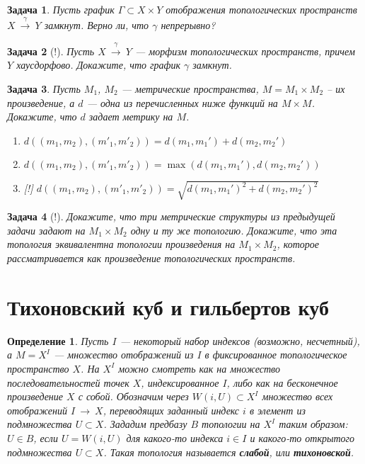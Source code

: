 \documentclass[12pt]{book}
\newcommand{\subs}{\section}
\newcommand{\arrow}{{\:\longrightarrow\:}}
\theoremstyle{upshape}
\newtheorem{zadacha}{Задача}[chapter]
\theoremstyle{generic}
\newtheorem{opredelenie}[teorema]{Определение}
\theoremstyle{upshapenonumber}
\newcommand{\следствие}{%
     \refstepcounter{teorema}
     {\noindent\bf Следствие \thechapter.\arabic{teorema}:\ }}
\newcommand{\пример}{%
     \refstepcounter{teorema}
     {\noindent\bf Пример \thechapter.\arabic{teorema}:\ }}
\newcommand{\лемма}{%
     \refstepcounter{teorema}
     {\noindent\bf Лемма \thechapter.\arabic{teorema}:\ }}
\newcommand{\теорема}{%
     \refstepcounter{teorema}
     {\noindent\bf Теорема \thechapter.\arabic{teorema}:\ }}
\newcommand{\утверждение}{%
     \refstepcounter{teorema}
     {\noindent\bf Утверждение \thechapter.\arabic{teorema}:\ }}
\def\бф{\bf}
\def\ит{\it}
\def\итем{\item %
}
\begin{document}
{\begin{zadacha}
Пусть график $\Gamma\subset X\times Y$ отображения топологических
пространств $X\overset{\gamma}{\arrow} Y$ замкнут. Верно ли, что
$\gamma$ непрерывно?
\end{zadacha}

\begin{zadacha}[!]
Пусть $X\overset{\gamma}{\arrow} Y$ --- морфизм топологических
пространств, причем $Y$ хаусдорфово. Докажите, что график $\gamma$
замкнут.
\end{zadacha}

\begin{zadacha} 
Пусть $M_1$, $M_2$ --- метрические пространства, $M=M_1\times M_2$ --
их произведение, а $d$ --- одна из перечисленных ниже функций на
$M\times M$. Докажите, что $d$ задает метрику на $M$.
\begin{enumerate}
\итем $d((m_1, m_2), (m'_1, m'_2)) = d(m_1, m_1') + d(m_2, m_2')$

\итем $d((m_1, m_2), (m'_1, m'_2)) = \max(d(m_1, m_1'), d(m_2, m_2'))$

\итем[!] $d((m_1, m_2), (m'_1, m'_2)) = \sqrt{d(m_1,
m_1')^2+d(m_2, m_2')^2}$
\end{enumerate}
\end{zadacha}

\begin{zadacha}[!] 
Докажите, что три метрические структуры из предыдущей задачи задают
на $M_1\times M_2$ одну и ту же топологию. Докажите, что эта
топология эквивалентна топологии произведения на $M_1\times M_2$,
которое рассматривается как произведение топологических пространств.
\end{zadacha}

\subs{Тихоновский куб и гильбертов куб}

\begin{opredelenie}
Пусть $I$ --- некоторый набор индексов (возможно, несчетный), а
$M=X^I$ --- множество отображений из $I$ в фиксированное
топологическое пространство $X$. На $X^I$ можно смотреть как на
множество последовательностей точек $X$, индексированное $I$, либо
как на бесконечное произведение $X$ с собой.  Обозначим через $W(i,
U)\subset X^I$ множество всех отображений $I\arrow X$, переводящих
заданный индекс $i$ в элемент из подмножества $U\subset X$. Зададим
предбазу $B$ топологии на $X^I$ таким образом: $U\in B$, если
$U=W(i, U)$ для какого-то индекса $i\in I$ и какого-то открытого
подмножества $U\subset X$. Такая топология называется {\bf
  слабой}, или {\бф тихоновской}.
\end{opredelenie}

}
\end{document}
